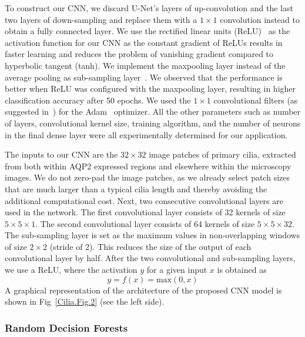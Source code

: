 To construct our CNN, we discard U-Net's layers of up-convolution and the last two layers of down-sampling and replace them with a $1 \times 1$ convolution instead to obtain a fully connected layer. We use the rectified linear units (ReLU)~\cite{ronneberger_UNet_2015} as the activation function for our CNN as the constant gradient of ReLUs results in faster learning and reduces the problem of vanishing gradient compared to hyperbolic tangent (tanh). We implement the maxpooling layer instead of the average pooling as sub-sampling layer~\cite{krizhevsky_Imagenet_2017}. We observed that the performance is better when ReLU was configured with the maxpooling layer, resulting in higher classification accuracy after 50 epochs. We used the $1 \times 1$ convolutional filters (as suggested in~\cite{gupta_Convolutional_2017}) for the Adam~\cite{kingma_Variational_2015} optimizer. All the other parameters such as number of layers, convolutional kernel size, training algorithm, and the number of neurons in the final dense layer were all experimentally determined for our application.

The inputs to our CNN are the $32 \times 32$ image patches of primary cilia, extracted from both within AQP2 expressed regions and elsewhere within the microscopy images. We do not zero-pad the image patches, as we already select patch sizes that are much larger than a typical cilia length and thereby avoiding the additional computational cost. Next, two consecutive convolutional layers are used in the network. The first convolutional layer consists of 32 kernels of size $5 \times 5 \times 1$. The second convolutional layer consists of 64 kernels of size $5 \times 5 \times 32$. The sub-sampling layer is set as the maximum values in non-overlapping windows of size $2 \times 2$ (stride of 2). This reduces the size of the output of each convolutional layer by half. After the two convolutional and sub-sampling layers, we use a ReLU, where the activation $y$ for a given input $x$ is obtained as
\begin{equation}
y = f(x) = \text{max}(0,x)
\label{Cilia.Eq.1}
\end{equation}
A graphical representation of the architecture of the proposed CNN model is shown in Fig~\ref{Cilia.Fig.2} (see the left side).

\subsubsection{\textbf{Random Decision Forests}}

